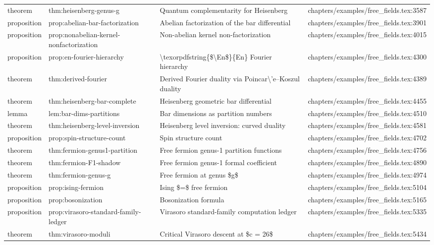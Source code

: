 \documentclass[11pt]{article}
\begin{document}
\begin{longtable}{L{0.10\textwidth}L{0.26\textwidth}L{0.42\textwidth}L{0.22\textwidth}}
theorem & thm:heisenberg-genus-g & Quantum complementarity for Heisenberg & chapters/examples/free\_fields.tex:3587\\
proposition & prop:abelian-bar-factorization & Abelian factorization of the bar differential & chapters/examples/free\_fields.tex:3901\\
proposition & prop:nonabelian-kernel-nonfactorization & Non-abelian kernel non-factorization & chapters/examples/free\_fields.tex:4015\\
proposition & prop:en-fourier-hierarchy & \textbackslash{}texorpdfstring\{\$\textbackslash{}En\$\}\{En\} Fourier hierarchy & chapters/examples/free\_fields.tex:4300\\
theorem & thm:derived-fourier & Derived Fourier duality via Poincar\textbackslash{}'e--Koszul duality & chapters/examples/free\_fields.tex:4389\\
theorem & thm:heisenberg-bar-complete & Heisenberg geometric bar differential & chapters/examples/free\_fields.tex:4455\\
lemma & lem:bar-dims-partitions & Bar dimensions as partition numbers & chapters/examples/free\_fields.tex:4510\\
theorem & thm:heisenberg-level-inversion & Heisenberg level inversion: curved duality & chapters/examples/free\_fields.tex:4581\\
proposition & prop:spin-structure-count & Spin structure count & chapters/examples/free\_fields.tex:4702\\
theorem & thm:fermion-genus1-partition & Free fermion genus-1 partition functions & chapters/examples/free\_fields.tex:4756\\
theorem & thm:fermion-F1-shadow & Free fermion genus-1 formal coefficient & chapters/examples/free\_fields.tex:4890\\
theorem & thm:fermion-genus-g & Free fermion at genus \$g\$ & chapters/examples/free\_fields.tex:4974\\
proposition & prop:ising-fermion & Ising \$=\$ free fermion & chapters/examples/free\_fields.tex:5104\\
proposition & prop:bosonization & Bosonization formula & chapters/examples/free\_fields.tex:5165\\
proposition & prop:virasoro-standard-family-led{}ger & Virasoro standard-family computation led{}ger & chapters/examples/free\_fields.tex:5335\\
theorem & thm:virasoro-moduli & Critical Virasoro descent at \$c = 26\$ & chapters/examples/free\_fields.tex:5434\\

\end{longtable}
\end{document}
